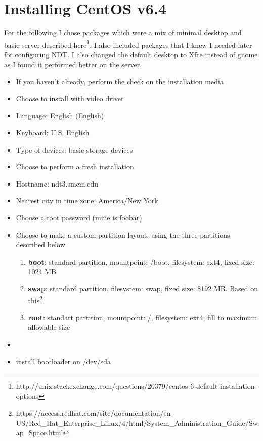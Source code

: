\section{Installing CentOS v6.4}\label{sec}
For the following I chose packages which were a mix of minimal desktop and basic server described \href{http://unix.stackexchange.com/questions/20379/centos-6-default-installation-options}{here}\footnote{http://unix.stackexchange.com/questions/20379/centos-6-default-installation-options}. I also included packages that I knew I needed later for configuring NDT. I also changed the default desktop to Xfce instead of gnome as I found it performed better on the server. 

\begin{itemize}
\item{If you haven't already, perform the check on the installation media \con}
\item{Choose to install with video driver \con}
\item{Language: English (English) \con}
\item{Keyboard: U.S. English \con}
\item{Type of devices: basic storage devices \con}
\item{Choose to perform a fresh installation \con}
\item{Hostname: ndt3.smcm.edu \con}
\item{Nearest city in time zone: America/New York \con}
\item{Choose a root password (mine is foobar) \con}
\item{Choose to make a custom partition layout, using the three partitions described below} 
\begin{enumerate}
\item{\textbf{boot}: standard partition, mountpoint: /boot, filesystem: ext4, fixed size: 1024 MB}
\item{\textbf{swap}: standard partition, filesystem: swap, fixed size: 8192 MB. Based on \href{https://access.redhat.com/site/documentation/en-US/Red_Hat_Enterprise_Linux/4/html/System_Administration_Guide/Swap_Space.html}{this}}\footnote{https://access.redhat.com/site/documentation/en-US/Red\_Hat\_Enterprise\_Linux/4/html/System\_Administration\_Guide/Swap\_Space.html}
\item{\textbf{root}: standart partition, mountpoint: /, filesystem: ext4, fill to maximum allowable size}
\end{enumerate}
\item{\con}
\item{install bootloader on /dev/sda \con}

\end{itemize}
